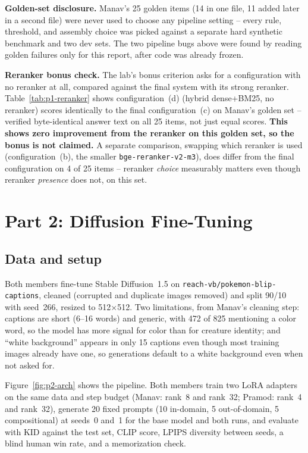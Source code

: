 \documentclass[conference,10pt]{IEEEtran}
\begin{document}
\textbf{Golden-set disclosure.} Manav's 25 golden items (14 in one file, 11 added later in a second
file) were never used to choose any pipeline setting -- every rule, threshold, and assembly choice
was picked against a separate hard synthetic benchmark and two dev sets. The two pipeline bugs above
were found by reading golden failures only for this report, after code was already frozen.



\textbf{Reranker bonus check.} The lab's bonus criterion asks for a configuration with no reranker at
all, compared against the final system with its strong reranker. Table~\ref{tab:p1-reranker} shows
configuration~(d) (hybrid dense+BM25, no reranker) scores identically to the final configuration~(c)
on Manav's golden set -- verified byte-identical answer text on all 25 items, not just equal scores.
\textbf{This shows zero improvement from the reranker on this golden set, so the bonus is not
claimed.} A separate comparison, swapping which reranker is used (configuration~(b), the smaller
\texttt{bge-reranker-v2-m3}), does differ from the final configuration on 4 of 25 items -- reranker
\emph{choice} measurably matters even though reranker \emph{presence} does not, on this set.

\section{Part 2: Diffusion Fine-Tuning}
\label{sec:p2}

\subsection{Data and setup}

Both members fine-tune Stable Diffusion~1.5 on \texttt{reach-vb/pokemon-blip-captions}, cleaned
(corrupted and duplicate images removed) and split 90/10 with seed~266, resized to 512$\times$512.
Two limitations, from Manav's cleaning step: captions are short (6--16 words) and generic, with 472
of 825 mentioning a color word, so the model has more signal for color than for creature identity;
and ``white background'' appears in only 15 captions even though most training images already have
one, so generations default to a white background even when not asked for.

Figure~\ref{fig:p2-arch} shows the pipeline. Both members train two LoRA adapters on the same data
and step budget (Manav: rank~8 and rank~32; Pramod: rank~4 and rank~32), generate 20 fixed prompts
(10 in-domain, 5 out-of-domain, 5 compositional) at seeds~0 and~1 for the base model and both runs,
and evaluate with KID against the test set, CLIP score, LPIPS diversity between seeds, a blind human
win rate, and a memorization check.
\end{document}
